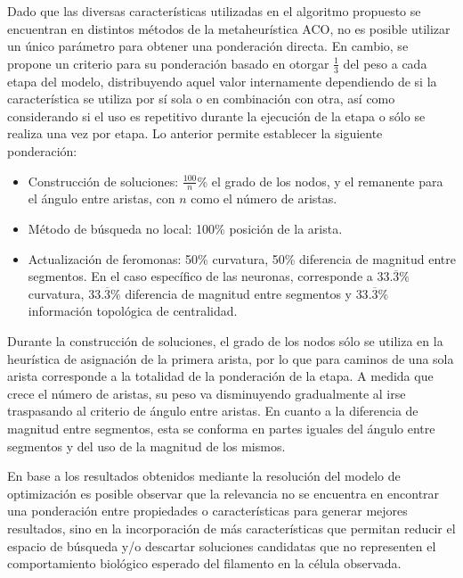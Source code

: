 Dado que las diversas caracter\'isticas utilizadas en el algoritmo propuesto se encuentran en distintos m\'etodos de la metaheur\'istica ACO, no es posible utilizar un \'unico par\'ametro para obtener una ponderaci\'on directa. En cambio, se propone un criterio para su ponderaci\'on basado en otorgar $\frac{1}{3}$ del peso a cada etapa del modelo, distribuyendo aquel valor internamente dependiendo de si la caracter\'istica se utiliza por s\'i sola o en combinaci\'on con otra, as\'i como considerando si el uso es repetitivo durante la ejecuci\'on de la etapa o s\'olo se realiza una vez por etapa. Lo anterior permite establecer la siguiente ponderaci\'on:

\begin{itemize}
    \item Construcci\'on de soluciones: $\frac{100}{n}$\% el grado de los nodos, y el remanente para el \'angulo entre aristas, con $n$ como el n\'umero de aristas.
    \item M\'etodo de b\'usqueda no local: 100\% posici\'on de la arista.
    \item Actualizaci\'on de feromonas: 50\% curvatura, 50\% diferencia de magnitud entre segmentos. En el caso espec\'ifico de las neuronas, corresponde a $33.\overline{3}\%$ curvatura, $33.\overline{3}\%$ diferencia de magnitud entre segmentos y $33.\overline{3}\%$ informaci\'on topol\'ogica de centralidad.
\end{itemize}

Durante la construcci\'on de soluciones, el grado de los nodos s\'olo se utiliza en la heur\'istica de asignaci\'on de la primera arista, por lo que para caminos de una sola arista corresponde a la totalidad de la ponderaci\'on de la etapa. A medida que crece el n\'umero de aristas, su peso va disminuyendo gradualmente al irse traspasando al criterio de \'angulo entre aristas. En cuanto a la diferencia de magnitud entre segmentos, esta se conforma en partes iguales del \'angulo entre segmentos y del uso de la magnitud de los mismos.


En base a los resultados obtenidos mediante la resoluci\'on del modelo de optimizaci\'on es posible observar que la relevancia no se encuentra en encontrar una ponderaci\'on entre propiedades o caracter\'isticas para generar mejores resultados, sino en la incorporaci\'on de m\'as caracter\'isticas que permitan reducir el espacio de b\'usqueda y/o descartar soluciones candidatas que no representen el comportamiento biol\'ogico esperado del filamento en la c\'elula observada.

